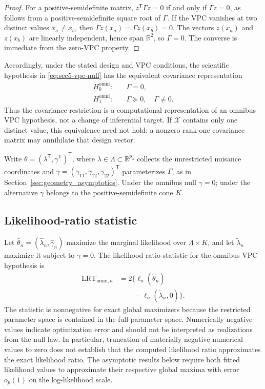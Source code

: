 \begin{proof}
For a positive-semidefinite matrix, $z^{\mathsf T}\Gamma z=0$
if and only if $\Gamma z=0$, as follows from a positive-semidefinite
square root of $\Gamma$. If the VPC vanishes at two distinct values
$x_a\ne x_b$, then $\Gamma z(x_a)=\Gamma z(x_b)=0$.
The vectors $z(x_a)$ and $z(x_b)$ are linearly independent, hence
span $\mathbb R^2$, so $\Gamma=0$. The converse is immediate from
the zero-VPC property.
\end{proof}

Accordingly, under the stated design and VPC conditions, the scientific
hypothesis in \eqref{eq:sec5-vpc-null} has the equivalent covariance
representation
\begin{equation}\label{eq:sec5-null}
 \begin{aligned}
 H_0^{\mathrm{omni}}:&\quad\Gamma=0,\\
 H_1^{\mathrm{omni}}:&\quad\Gamma\succeq0,\quad\Gamma\ne0.
 \end{aligned}
\end{equation}
Thus the covariance restriction is a computational representation of an
omnibus VPC hypothesis, not a change of inferential target.
If $\mathcal X$ contains only one distinct value, this equivalence
need not hold: a nonzero rank-one covariance matrix may annihilate
that design vector.

Write $\theta=(\lambda^{\mathsf T},\gamma^{\mathsf T})^{\mathsf T}$,
where $\lambda\in\Lambda\subset\mathbb R^{p_\lambda}$ collects the
unrestricted nuisance coordinates and
$\gamma=(\gamma_{11},\gamma_{12},\gamma_{22})^{\mathsf T}$
parameterizes $\Gamma$, as in Section~\ref{sec:geometry_asymptotics}.
Under the omnibus null $\gamma=0$; under the alternative $\gamma$
belongs to the positive-semidefinite cone $K$.

\subsection{Likelihood-ratio statistic}
\label{subsec:global_lrt_statistic}
Let $\widehat\theta_n=(\widehat\lambda_n,\widehat\gamma_n)$
maximize the marginal likelihood over $\Lambda\times K$, and let
$\widetilde\lambda_n$ maximize it subject to $\gamma=0$.
The likelihood-ratio statistic for the omnibus VPC hypothesis is
\begin{equation}\label{eq:sec5-lrt}
 \begin{aligned}
 \mathrm{LRT}_{\mathrm{omni},n}
 &=2\bigl\{\ell_n(\widehat\theta_n)\\
 &\qquad-\ell_n(\widetilde\lambda_n,0)\bigr\}.
 \end{aligned}
\end{equation}
The statistic is nonnegative for exact global maximizers because the
restricted parameter space is contained in the full parameter space.
Numerically negative values indicate optimization error and should
not be interpreted as realizations from the null law. In particular,
truncation of materially negative numerical values to zero does not
establish that the computed likelihood ratio approximates the exact
likelihood ratio. The asymptotic results below require both fitted
likelihood values to approximate their respective global maxima with
error $o_p(1)$ on the log-likelihood scale.

